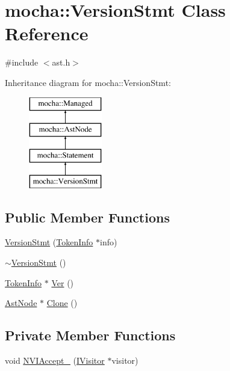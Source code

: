 \hypertarget{classmocha_1_1_version_stmt}{
\section{mocha::VersionStmt Class Reference}
\label{classmocha_1_1_version_stmt}
}


{\ttfamily \#include $<$ast.h$>$}

Inheritance diagram for mocha::VersionStmt:\begin{figure}[H]
\begin{center}
\leavevmode
\includegraphics[height=4.000000cm]{classmocha_1_1_version_stmt}
\end{center}
\end{figure}
\subsection*{Public Member Functions}
\begin{DoxyCompactItemize}
\item 
\hyperlink{classmocha_1_1_version_stmt_a8c9d165376a1ff56ef89d372ae1534d9}{VersionStmt} (\hyperlink{classmocha_1_1_token_info}{TokenInfo} $\ast$info)
\item 
\hyperlink{classmocha_1_1_version_stmt_a749a79df02a691886a61e0210c80dbf3}{$\sim$VersionStmt} ()
\item 
\hyperlink{classmocha_1_1_token_info}{TokenInfo} $\ast$ \hyperlink{classmocha_1_1_version_stmt_aaa6d723d701aec97a33861f984b1c84c}{Ver} ()
\item 
\hyperlink{classmocha_1_1_ast_node}{AstNode} $\ast$ \hyperlink{classmocha_1_1_version_stmt_adc1b32c470560bd57e80f5d58bb57946}{Clone} ()
\end{DoxyCompactItemize}
\subsection*{Private Member Functions}
\begin{DoxyCompactItemize}
\item 
void \hyperlink{classmocha_1_1_version_stmt_a82e2f78b4d3b39b1a73bd15d84cbf6f6}{NVIAccept\_\-} (\hyperlink{classmocha_1_1_i_visitor}{IVisitor} $\ast$visitor)
\end{DoxyCompactItemize}
